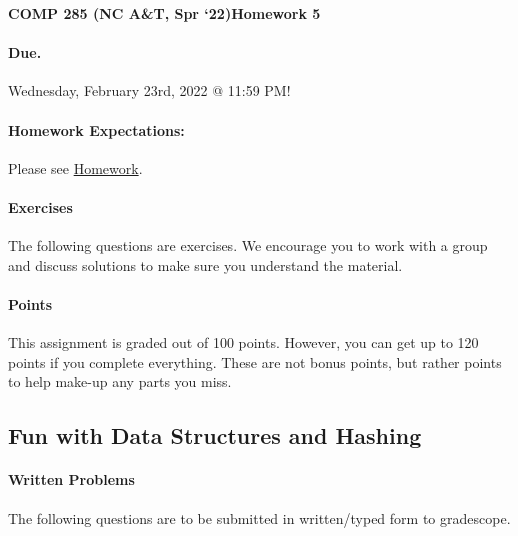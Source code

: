 \documentclass [12pt]{article}
\begin{document}
 

{\LARGE \textbf {COMP 285 (NC A\&T, Spr `22)}\hfill \textbf {Homework 5} } 
\vspace {1em} 
\begin{Instruction} 

\paragraph {Due.} Wednesday, February 23rd, 2022 @ 11:59 PM!
\end{Instruction} 

\vspace {1em} 
\begin{Instruction} \paragraph {Homework Expectations:} Please see \href{https://www.comp285.ml/homework/#general-homework-information}{Homework}.
\end{Instruction}

\vspace {1em} 
\begin{Instruction} 

\paragraph {Exercises} The following questions are exercises. We encourage you to work with a group and discuss solutions to make sure you understand the material.

\paragraph {Points} This assignment is graded out of 100 points. However, you can get up to 120 points if you complete everything. These are not bonus points, but rather points to help make-up any parts you miss.

\end{Instruction} 

\begin{centering}
\section*{Fun with Data Structures and Hashing}
\end{centering}

\begin{Instruction}

\paragraph{Written Problems} The following questions are to be submitted in written/typed form to gradescope.

\end{Instruction}
\end{document}
